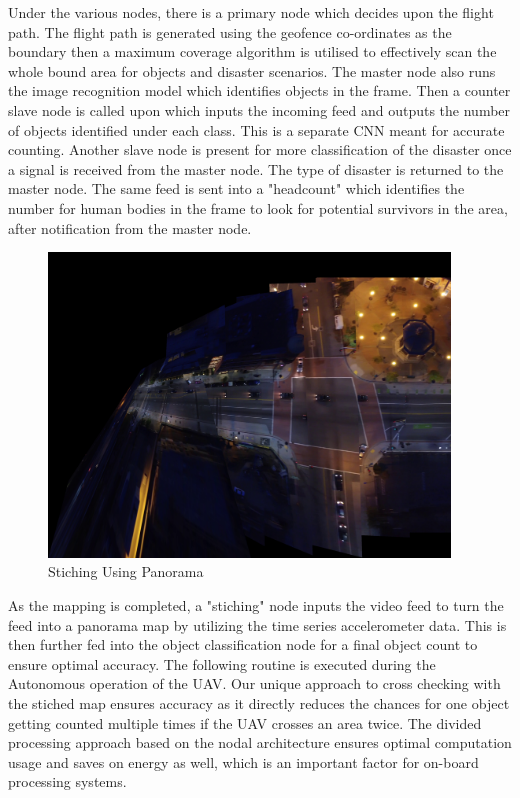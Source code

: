 \documentclass[12pt]{report}
\begin{document}
Under the various nodes, there is a primary node which decides upon the flight path. The flight path is generated using the geofence co-ordinates as the boundary then a maximum coverage algorithm is utilised to effectively scan the whole bound area for objects and disaster scenarios. The master node also runs the image recognition model which identifies objects in the frame. Then a counter slave node is called upon which inputs the incoming feed and outputs the number of objects identified under each class. This is a separate CNN meant for accurate counting. Another slave node is present for more classification of the disaster once a signal is received from the master node. The type of disaster is returned to the master node. The same feed is sent into a "headcount" which identifies the number for human bodies in the frame to look for potential survivors in the area, after notification from the master node.\\

\begin{figure}[H]
  \begin{center}
    \includegraphics[width=0.95\textwidth]{night.mp4.jpg}
  \end{center}
  \caption{Stiching Using Panorama}\label{fig:night}
\end{figure}


As the mapping is completed, a "stiching" node inputs the video feed to turn the feed into a panorama map by utilizing the time series accelerometer data. This is then further fed into the object classification node for a final object count to ensure optimal accuracy. The following routine is executed during the Autonomous operation of the UAV. Our unique approach to cross checking with the stiched map ensures accuracy as it directly reduces the chances for one object getting counted multiple times if the UAV crosses an area twice. The divided processing approach based on the nodal architecture ensures optimal computation usage and saves on energy as well, which is an important factor for on-board processing systems.
\end{document}
